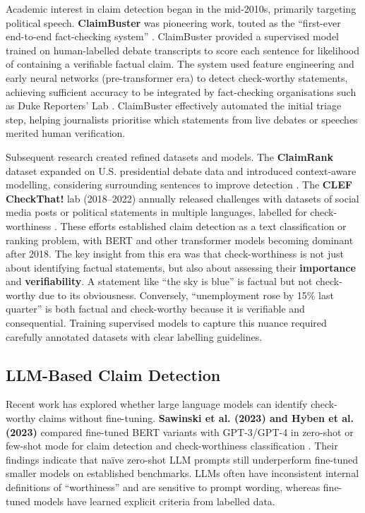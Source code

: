 \documentclass[12pt,a4paper]{article}
\begin{document}
Academic interest in claim detection began in the mid-2010s, primarily targeting political speech. \textbf{ClaimBuster} was pioneering work, touted as the ``first-ever end-to-end fact-checking system'' \citep{hassan2021claimbuster}. ClaimBuster provided a supervised model trained on human-labelled debate transcripts to score each sentence for likelihood of containing a verifiable factual claim. The system used feature engineering and early neural networks (pre-transformer era) to detect check-worthy statements, achieving sufficient accuracy to be integrated by fact-checking organisations such as Duke Reporters' Lab \citep{hassan2021claimbuster}. ClaimBuster effectively automated the initial triage step, helping journalists prioritise which statements from live debates or speeches merited human verification.

Subsequent research created refined datasets and models. The \textbf{ClaimRank} dataset expanded on U.S. presidential debate data and introduced context-aware modelling, considering surrounding sentences to improve detection \citep{gencheva2017claimrank}. The \textbf{CLEF CheckThat!} lab (2018--2022) annually released challenges with datasets of social media posts or political statements in multiple languages, labelled for check-worthiness \citep{thorne2018fever}. These efforts established claim detection as a text classification or ranking problem, with BERT and other transformer models becoming dominant after 2018. The key insight from this era was that check-worthiness is not just about identifying factual statements, but also about assessing their \textbf{importance} and \textbf{verifiability}. A statement like ``the sky is blue'' is factual but not check-worthy due to its obviousness. Conversely, ``unemployment rose by 15\% last quarter'' is both factual and check-worthy because it is verifiable and consequential. Training supervised models to capture this nuance required carefully annotated datasets with clear labelling guidelines.

\subsection{LLM-Based Claim Detection}

Recent work has explored whether large language models can identify check-worthy claims without fine-tuning. \textbf{Sawinski et al. (2023) and Hyben et al. (2023)} compared fine-tuned BERT variants with GPT-3/GPT-4 in zero-shot or few-shot mode for claim detection and check-worthiness classification \citep{sawinski2024comparison}. Their findings indicate that naïve zero-shot LLM prompts still underperform fine-tuned smaller models on established benchmarks. LLMs often have inconsistent internal definitions of ``worthiness'' and are sensitive to prompt wording, whereas fine-tuned models have learned explicit criteria from labelled data.
\end{document}
